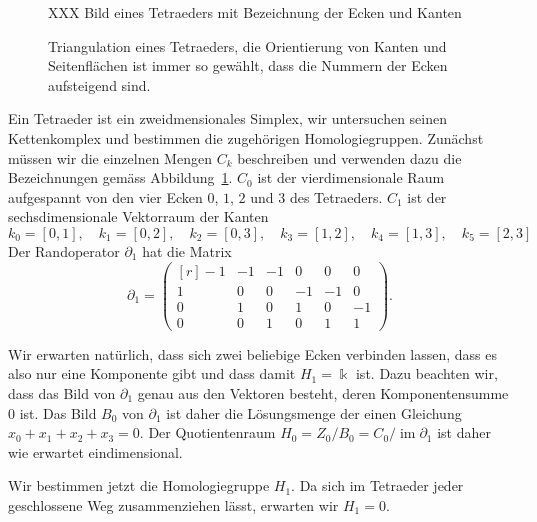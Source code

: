 \begin{beispiel}
\begin{figure}
\centering
XXX Bild eines Tetraeders mit Bezeichnung der Ecken und Kanten
\caption{Triangulation eines Tetraeders, die Orientierung von Kanten
und Seitenflächen ist immer so gewählt, dass die Nummern der Ecken
aufsteigend sind.
\label{buch:homologie:tetraeder:fig}}
\end{figure}
Ein Tetraeder ist ein zweidmensionales Simplex, wir untersuchen seinen
Kettenkomplex und bestimmen die zugehörigen Homologiegruppen.
Zunächst müssen wir die einzelnen Mengen $C_k$ beschreiben und verwenden
dazu die Bezeichnungen gemäss Abbildung~\ref{buch:homologie:tetraeder:fig}.
$C_0$ ist der vierdimensionale Raum aufgespannt von den vier Ecken 
$0$, $1$, $2$ und $3$ des Tetraeders.
$C_1$ ist der sechsdimensionale Vektorraum der Kanten 
\[
k_0 = [0,1],\quad
k_1 = [0,2],\quad
k_2 = [0,3],\quad
k_3 = [1,2],\quad
k_4 = [1,3],\quad
k_5 = [2,3]
\]
Der Randoperator $\partial_1$ hat die Matrix
\[
\partial_1
=
\begin{pmatrix*}[r]
-1&-1&-1& 0& 0& 0\\
 1& 0& 0&-1&-1& 0\\
 0& 1& 0& 1& 0&-1\\
 0& 0& 1& 0& 1& 1
\end{pmatrix*}.
\]

Wir erwarten natürlich, dass sich zwei beliebige Ecken verbinden lassen,
dass es also nur eine Komponente gibt und dass damit $H_1=\Bbbk$ ist.
Dazu beachten wir, dass das Bild von $\partial_1$ genau aus den Vektoren
besteht, deren Komponentensumme $0$ ist.
Das Bild $B_0$ von $\partial_1$ ist daher die Lösungsmenge der einen
Gleichung
\(
x_0+x_1+x_2+x_3=0.
\)
Der Quotientenraum $H_0=Z_0/B_0 = C_0/\operatorname{im}\partial_1$
ist daher wie erwartet eindimensional.

Wir bestimmen jetzt die Homologiegruppe $H_1$.
Da sich im Tetraeder jeder geschlossene Weg zusammenziehen lässt,
erwarten wir $H_1=0$.


\end{beispiel}
